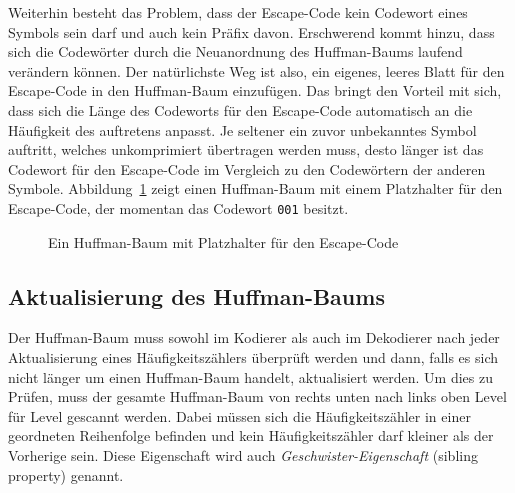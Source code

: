 \documentclass[twoside,11pt,a4paper]{article}
\theoremstyle{break}
\begin{document}
Weiterhin besteht das Problem, dass der Escape-Code kein Codewort
eines Symbols sein darf und auch kein Präfix davon. Erschwerend kommt
hinzu, dass sich die Codewörter durch die Neuanordnung des
Huffman-Baums laufend verändern können. Der natürlichste Weg ist also,
ein eigenes, leeres Blatt für den Escape-Code in den Huffman-Baum
einzufügen. Das bringt den Vorteil mit sich, dass sich die Länge des
Codeworts für den Escape-Code automatisch an die Häufigkeit des
auftretens anpasst. Je seltener ein zuvor unbekanntes Symbol auftritt,
welches unkomprimiert übertragen werden muss, desto länger ist das
Codewort für den Escape-Code im Vergleich zu den Codewörtern der
anderen Symbole. Abbildung~\ref{fig:HESC} zeigt einen Huffman-Baum mit
einem Platzhalter für den Escape-Code, der momentan das Codewort
{\tt001} besitzt.

\begin{figure}[h]
\centering
{}
\caption{Ein Huffman-Baum mit Platzhalter für den Escape-Code} \label{fig:HESC}
\end{figure}

\subsection{Aktualisierung des Huffman-Baums}
Der Huffman-Baum muss sowohl im Kodierer als auch im Dekodierer nach
jeder Aktualisierung eines Häufigkeitszählers überprüft werden und
dann, falls es sich nicht länger um einen Huffman-Baum handelt,
aktualisiert werden. Um dies zu Prüfen, muss der gesamte Huffman-Baum
von rechts unten nach links oben Level für Level gescannt
werden. Dabei müssen sich die Häufigkeitszähler in einer geordneten
Reihenfolge befinden und kein Häufigkeitszähler darf kleiner als der
Vorherige sein. Diese Eigenschaft wird auch
\emph{Geschwister-Eigenschaft} (sibling property) genannt.
\end{document}
